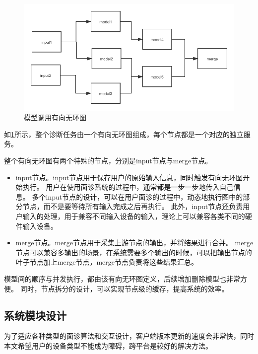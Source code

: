 \begin{figure}
    \centering
    \includegraphics[width=15cm]{images/model_dag.png}
    \caption{模型调用有向无环图}
    \label{fig:model_dag}
\end{figure}

如\ref{fig:model_dag}所示，整个诊断任务由一个有向无环图组成，每个节点都是一个对应的独立服务。

整个有向无环图有两个特殊的节点，分别是input节点与merge节点。

\begin{itemize}
    \item input节点。input节点用于保存用户的原始输入信息，同时触发有向无环图开始执行。
    用户在使用面诊系统的过程中，通常都是一步一步地传入自己信息。
    多个input节点的设计，可以在用户面诊的过程中，动态地执行图中的部分节点，而不是要等待所有输入完成之后再执行。
    此外，input节点还负责用户输入的处理，用于兼容不同输入设备的输入，理论上可以兼容各类不同的硬件输入设备。

    \item merge节点。merge节点用于采集上游节点的输出，并将结果进行合并。
    merge节点可以兼容多输出的场景，在系统需要多个输出的时候，可以把输出节点的叶子节点加上merge节点，merge节点负责将这些结果汇总。
\end{itemize}



模型间的顺序与并发执行，都由该有向无环图定义，后续增加删除模型也非常方便。
同时，节点拆分的设计，可以实现节点级的缓存，提高系统的效率。


\subsection{系统模块设计}
为了适应各种类型的面诊算法和交互设计，客户端版本更新的速度会非常快，同时本文希望用户的设备类型不能成为障碍，跨平台是较好的解决方法。


